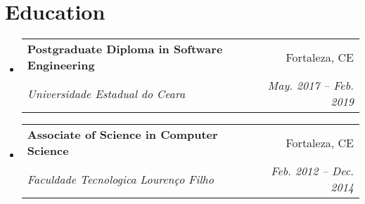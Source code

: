 \documentclass[letterpaper,11pt]{article}
\makeatletter
\newcommand{\resumeItem}[2]{
  \item\small{
    \textbf{#1}{: #2 \vspace{-2pt}}
  }
}
\newcommand{\resumeSubheading}[4]{
  \vspace{-1pt}\item
    \begin{tabular*}{0.97\textwidth}[t]{l@{\extracolsep{\fill}}r}
      \textbf{#1} & #2 \\
      \textit{\small#3} & \textit{\small #4} \\
    \end{tabular*}\vspace{-5pt}
}
\newcommand{\resumeSubSubheading}[2]{
    \begin{tabular*}{0.97\textwidth}{l@{\extracolsep{\fill}}r}
      \textit{\small#1} & \textit{\small #2} \\
    \end{tabular*}\vspace{-5pt}
}
\newcommand{\resumeSubItem}[2]{\resumeItem{#1}{#2}\vspace{-4pt}}
\newcommand{\resumeSubHeadingListStart}{\begin{itemize}[leftmargin=*]}
\newcommand{\resumeSubHeadingListEnd}{\end{itemize}}
\newcommand{\resumeItemListStart}{\begin{itemize}}
\newcommand{\resumeItemListEnd}{\end{itemize}\vspace{-5pt}}
\makeatother
\begin{document}
\section{Education}
  \resumeSubHeadingListStart
    \resumeSubheading
      {Postgraduate Diploma in Software Engineering}{Fortaleza, CE}
      {Universidade Estadual do Ceara}{May. 2017 -- Feb. 2019}
    \resumeSubheading
      {Associate of Science in Computer Science}{Fortaleza, CE}
      {Faculdade Tecnologica Lourenço Filho}{Feb. 2012 -- Dec. 2014}
  \resumeSubHeadingListEnd


%
%
\end{document}
